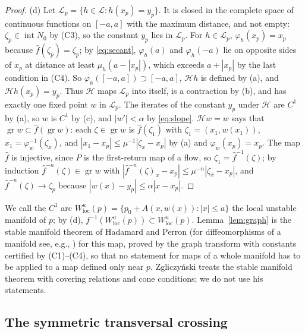 \documentclass[11pt]{article}
\theoremstyle{definition}
\begin{document}
\begin{proof}
(d) Let $\mathcal L_p = \{h \in \mathcal L : h(x_p) = y_p\}$. It is closed in the complete space of continuous functions on $[-a, a]$ with the maximum distance, and not empty: $\zeta_p \in \operatorname{int}N_0$ by (C3), so the constant $y_p$ lies in $\mathcal L_p$. For $h \in \mathcal L_p$, $\varphi_h(x_p) = x_p$ because $\hat f(\zeta_p) = \zeta_p$; by \eqref{eq:secant}, $\varphi_h(a)$ and $\varphi_h(-a)$ lie on opposite sides of $x_p$ at distance at least $\mu_h(a - |x_p|)$, which exceeds $a + |x_p|$ by the last condition in (C4). So $\varphi_h([-a, a]) \supset [-a, a]$, $\mathcal H h$ is defined by (a), and $\mathcal H h(x_p) = y_p$. Thus $\mathcal H$ maps $\mathcal L_p$ into itself, is a contraction by (b), and has exactly one fixed point $w$ in $\mathcal L_p$. The iterates of the constant $y_p$ under $\mathcal H$ are $C^1$ by (a), so $w$ is $C^1$ by (c), and $|w'| < \alpha$ by \eqref{eq:slope}. $\mathcal H w = w$ says that $\operatorname{gr}w \subset \hat f(\operatorname{gr}w)$: each $\zeta \in \operatorname{gr}w$ is $\hat f(\zeta_1)$ with $\zeta_1 = (x_1, w(x_1))$, $x_1 = \varphi_w^{-1}(\zeta_x)$, and $|x_1 - x_p| \le \mu^{-1}|\zeta_x - x_p|$ by (a) and $\varphi_w(x_p) = x_p$. The map $\hat f$ is injective, since $P$ is the first-return map of a flow, so $\zeta_1 = \hat f^{-1}(\zeta)$; by induction $\hat f^{-n}(\zeta) \in \operatorname{gr}w$ with $|\hat f^{-n}(\zeta)_x - x_p| \le \mu^{-n}|\zeta_x - x_p|$, and $\hat f^{-n}(\zeta) \to \zeta_p$ because $|w(x) - y_p| \le \alpha|x - x_p|$.
\end{proof}

We call the $C^1$ arc $W^u_{\mathrm{loc}}(p) = \{p_0 + A(x, w(x)) : |x| \le a\}$ the local unstable manifold of $p$; by (d), $f^{-1}(W^u_{\mathrm{loc}}(p)) \subset W^u_{\mathrm{loc}}(p)$. Lemma~\ref{lem:graph} is the stable manifold theorem of Hadamard and Perron \cite{hadamard1901, perron1929} (for diffeomorphisms of a manifold see, e.g., \cite[Sect.~4.1, Thm.~4]{dyatlov2018}) for this map, proved by the graph transform with constants certified by (C1)--(C4), so that no statement for maps of a whole manifold has to be applied to a map defined only near $p$. Zgliczy\'nski \cite{z2009} treats the stable manifold theorem with covering relations and cone conditions; we do not use his statements.

\subsection{The symmetric transversal crossing}
\end{document}
